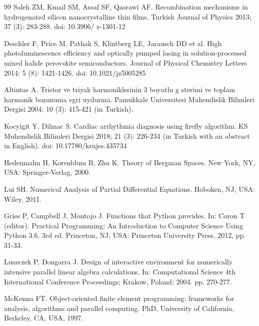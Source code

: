 \documentclass{article}
\begin{document}
\begin{thebibliography}{99}
 Saleh ZM, Kmail SM, Assaf SF, Qasrawi AF. Recombination mechanisms in hydrogenated silicon nanocrystalline thin films. Turkish Journal of Physics 2013; 37 (3): 283-288. doi: 10.3906/ z-1301-12

 Deschler F, Price M, Pathak S, Klintberg LE, Jarausch DD et al. High photoluminescence efficiency and optically pumped lasing in solution-processed mixed halide perovskite semiconductors. Journal of Physical Chemistry Letters 2014; 5 (8): 1421-1426. doi: 10.1021/jz5005285

 Altintas A. Tristor ve triyak harmoniklerinin 3 boyutlu g sterimi ve toplam harmonik bozunuma egri uydurma. Pamukkale Universitesi Muhendislik Bilimleri Dergisi 2004; 10 (3): 415-421 (in Turkish).

 Kocyigit Y, Dilmac S. Cardiac arrhythmia diagnosis using firefly algorithm. KS  Muhendislik Bilimleri Dergisi 2018; 21 
(3): 226-234 (in Turkish with an abstract in English). doi: 10.17780/ksujes.435734

 Hedenmalm H, Korenblum B, Zhu K. Theory of Bergman Spaces. New York, NY, USA: Springer-Verlag, 2000.

 Lui SH. Numerical Analysis of Partial Differential Equations. Hoboken, NJ, USA: Wiley, 2011.

 Gries P, Campbell J, Montojo J. Functions that Python provides. In: Coron T (editor). Practical Programming: An Introduction to Computer Science Using Python 3.6. 3rd ed. Princeton, NJ, USA: Princeton University Press, 2012, pp. 31-33.

 Luszczek P, Dongarra J. Design of interactive environment for numerically intensive parallel linear algebra calculations. In: Computational Science  4th International Conference Proceedings; Krakow, Poland; 2004. pp. 270-277.

 McKenna FT. Object-oriented finite element programming: frameworks for analysis, algorithms and parallel computing. PhD, University of California, Berkeley, CA, USA, 1997.
\end{thebibliography}
\end{document}
